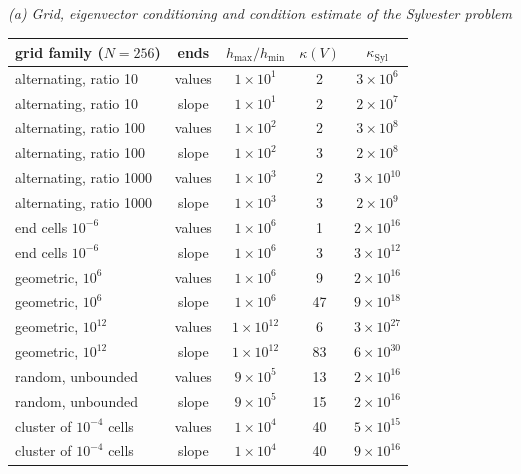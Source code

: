 \textit{(a) Grid, eigenvector conditioning and condition estimate of the Sylvester problem}\\[2pt]
\begin{tabular}{>{\raggedright\arraybackslash}p{}c c c c}
\toprule
grid family ($N=256$) & ends & $h_{\max}/h_{\min}$ & $\kappa(V)$ & $\kappa_{\mathrm{Syl}}$\\
\midrule
alternating, ratio 10 & values & $1{\times}10^{1}$ & 2 & $3{\times}10^{6}$\\
alternating, ratio 10 & slope & $1{\times}10^{1}$ & 2 & $2{\times}10^{7}$\\
alternating, ratio 100 & values & $1{\times}10^{2}$ & 2 & $3{\times}10^{8}$\\
alternating, ratio 100 & slope & $1{\times}10^{2}$ & 3 & $2{\times}10^{8}$\\
alternating, ratio 1000 & values & $1{\times}10^{3}$ & 2 & $3{\times}10^{10}$\\
alternating, ratio 1000 & slope & $1{\times}10^{3}$ & 3 & $2{\times}10^{9}$\\
end cells $10^{-6}$ & values & $1{\times}10^{6}$ & 1 & $2{\times}10^{16}$\\
end cells $10^{-6}$ & slope & $1{\times}10^{6}$ & 3 & $3{\times}10^{12}$\\
geometric, $10^6$ & values & $1{\times}10^{6}$ & 9 & $2{\times}10^{16}$\\
geometric, $10^6$ & slope & $1{\times}10^{6}$ & 47 & $9{\times}10^{18}$\\
geometric, $10^{12}$ & values & $1{\times}10^{12}$ & 6 & $3{\times}10^{27}$\\
geometric, $10^{12}$ & slope & $1{\times}10^{12}$ & 83 & $6{\times}10^{30}$\\
random, unbounded & values & $9{\times}10^{5}$ & 13 & $2{\times}10^{16}$\\
random, unbounded & slope & $9{\times}10^{5}$ & 15 & $2{\times}10^{16}$\\
cluster of $10^{-4}$ cells & values & $1{\times}10^{4}$ & 40 & $5{\times}10^{15}$\\
cluster of $10^{-4}$ cells & slope & $1{\times}10^{4}$ & 40 & $9{\times}10^{16}$\\
\bottomrule
\end{tabular}


